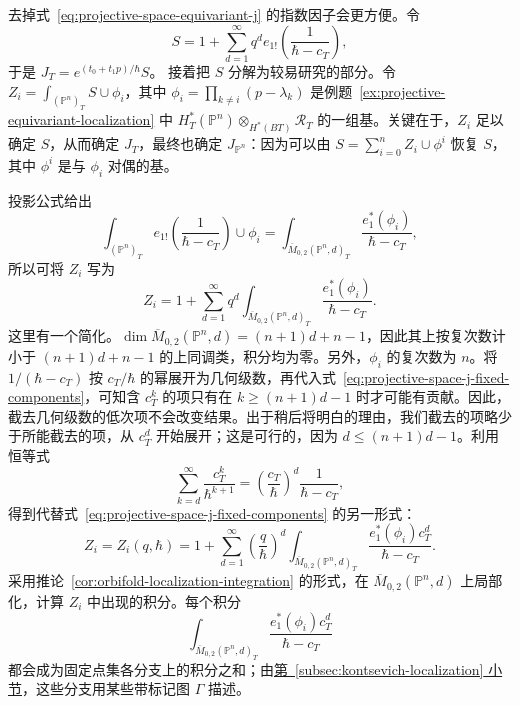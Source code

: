 去掉式~\eqref{eq:projective-space-equivariant-j} 的指数因子会更方便。令
\[
S=1+\sum_{d=1}^{\infty}q^d e_{1!}\left(\frac1{\hbar-c_T}\right),
\]
于是 $J_T=e^{(t_0+t_1p)/\hbar}S$。
接着把 $S$ 分解为较易研究的部分。令 $Z_i=\int_{(\mathbb P^n)_T}S\cup\phi_i$，其中 $\phi_i=\prod_{k\ne i}(p-\lambda_k)$ 是例题~\ref{ex:projective-equivariant-localization} 中 $H_T^*(\mathbb P^n)\otimes_{H^*(BT)}\mathcal R_T$ 的一组基。关键在于，$Z_i$ 足以确定 $S$，从而确定 $J_T$，最终也确定 $J_{\mathbb P^n}$：因为可以由 $S=\sum_{i=0}^nZ_i\cup\phi^i$ 恢复 $S$，其中 $\phi^i$ 是与 $\phi_i$ 对偶的基。

投影公式给出
\[
\int_{(\mathbb P^n)_T}e_{1!}\left(\frac1{\hbar-c_T}\right)\cup\phi_i
=\int_{\overline M_{0,2}(\mathbb P^n,d)_T}\frac{e_1^*(\phi_i)}{\hbar-c_T},
\]
所以可将 $Z_i$ 写为
\begin{equation}\label{eq:projective-space-j-fixed-components}
Z_i=1+\sum_{d=1}^{\infty}q^d\int_{\overline M_{0,2}(\mathbb P^n,d)_T}\frac{e_1^*(\phi_i)}{\hbar-c_T}.
\end{equation}
这里有一个简化。$\dim\overline M_{0,2}(\mathbb P^n,d)=(n+1)d+n-1$，因此其上按复次数计小于 $(n+1)d+n-1$ 的上同调类，积分均为零。另外，$\phi_i$ 的复次数为 $n$。将 $1/(\hbar-c_T)$ 按 $c_T/\hbar$ 的幂展开为几何级数，再代入式~\eqref{eq:projective-space-j-fixed-components}，可知含 $c_T^k$ 的项只有在 $k\ge(n+1)d-1$ 时才可能有贡献。因此，截去几何级数的低次项不会改变结果。出于稍后将明白的理由，我们截去的项略少于所能截去的项，从 $c_T^d$ 开始展开；这是可行的，因为 $d\le(n+1)d-1$。利用恒等式
\begin{equation}\label{eq:projective-space-descendant-truncation}
\sum_{k=d}^{\infty}\frac{c_T^k}{\hbar^{k+1}}=\left(\frac{c_T}{\hbar}\right)^d\frac1{\hbar-c_T},
\end{equation}
得到代替式~\eqref{eq:projective-space-j-fixed-components} 的另一形式：
\begin{equation}\label{eq:projective-space-j-truncated-components}
Z_i=Z_i(q,\hbar)=1+\sum_{d=1}^{\infty}\left(\frac q\hbar\right)^d
\int_{\overline M_{0,2}(\mathbb P^n,d)_T}\frac{e_1^*(\phi_i)c_T^d}{\hbar-c_T}.
\end{equation}
采用推论~\ref{cor:orbifold-localization-integration} 的形式，在 $\overline M_{0,2}(\mathbb P^n,d)$ 上局部化，计算 $Z_i$ 中出现的积分。每个积分
\[
\int_{\overline M_{0,2}(\mathbb P^n,d)_T}\frac{e_1^*(\phi_i)c_T^d}{\hbar-c_T}
\]
都会成为固定点集各分支上的积分之和；由\hyperref[subsec:kontsevich-localization]{第~\ref*{subsec:kontsevich-localization} 小节}，这些分支用某些带标记图 $\Gamma$ 描述。

